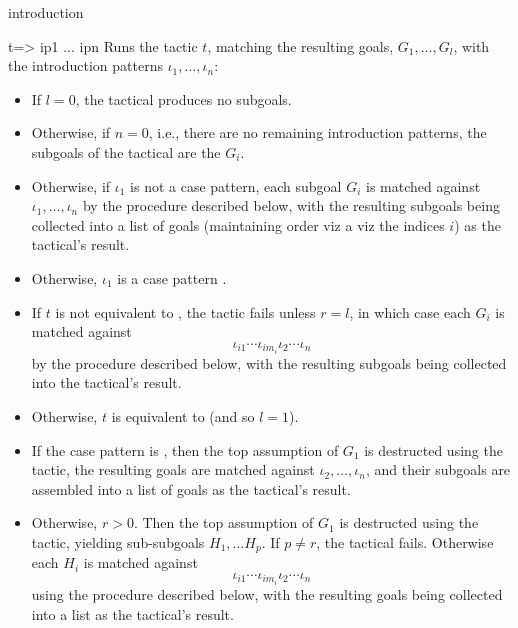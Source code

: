 \begin{tactic}[$t$ =>$\;\iota_1 \cdots \iota_n$]{introduction}
  \begin{tsyntax}[empty]{t=> ip1 ... ipn}
    Runs the tactic $t$, matching the resulting goals, $G_1,\ldots,G_l$,
    with the introduction patterns $\iota_1,\ldots,\iota_n$:
    \begin{itemize}
    \item  If $l=0$, the tactical produces no subgoals.

    \item Otherwise, if $n=0$, i.e., there are no remaining
      introduction patterns, the subgoals of the tactical are the
      $G_i$.

    \item Otherwise, if $\iota_1$ is not a case pattern, each subgoal
      $G_i$ is matched against $\iota_1,\ldots,\iota_n$ by the
      procedure described below, with the resulting subgoals being
      collected into a list of goals (maintaining order viz a viz the
      indices $i$) as the tactical's result.

    \item Otherwise, $\iota_1$ is a case pattern
          .

     \item If $t$ is not equivalent to , the tactic fails
       unless $r = l$, in which case each $G_i$ is matched against 
        \begin{displaymath}
          \iota_{i1}\cdots\iota_{i{m_i}}\iota_2\cdots \iota_n
        \end{displaymath}
       by the procedure described below, with the resulting subgoals
       being collected into the tactical's result.

    \item Otherwise, $t$ is equivalent to  (and so
      $l=1$).

    \item If the case pattern is \ec{[]}, then the top assumption of
      $G_1$ is destructed using the  tactic, the
      resulting goals are matched against $\iota_2,\ldots,\iota_n$,
      and their subgoals are assembled into a list of goals as the
      tactical's result.

    \item Otherwise, $r>0$. Then the top assumption of $G_1$ is
      destructed using the  tactic, yielding
      sub-subgoals $H_1,\ldots H_p$. If $p\neq r$, the tactical
      fails. Otherwise each $H_i$ is matched against
      \begin{displaymath}
        \iota_{i1}\cdots\iota_{i{m_i}}\iota_2\cdots \iota_n
      \end{displaymath}
      using the procedure described below, with the resulting goals
      being collected into a list as the tactical's result.
    \end{itemize}


\end{tsyntax}
\end{tactic}
